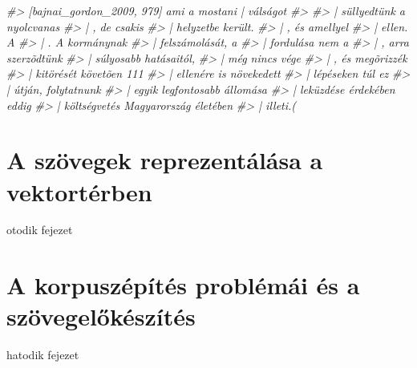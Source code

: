 \documentclass[
]{book}
\newenvironment{Shaded}{\begin{snugshade}}{\end{snugshade}}
\newcommand{\CommentTok}[1]{\textcolor[rgb]{0.56,0.35,0.01}{\textit{#1}}}
\begin{document}
\begin{Shaded}
\begin{Highlighting}[]
\CommentTok{\#\textgreater{}   [bajnai\_gordon\_2009, 979]                      ami a mostani |    válságot   }
\CommentTok{\#\textgreater{}                                      }
\CommentTok{\#\textgreater{}  | süllyedtünk a nyolcvanas          }
\CommentTok{\#\textgreater{}  | , de csakis                       }
\CommentTok{\#\textgreater{}  | helyzetbe került.                 }
\CommentTok{\#\textgreater{}  | , és amellyel                     }
\CommentTok{\#\textgreater{}  | ellen. A                          }
\CommentTok{\#\textgreater{}  | . A kormánynak                    }
\CommentTok{\#\textgreater{}  | felszámolását, a                  }
\CommentTok{\#\textgreater{}  | fordulása nem a                   }
\CommentTok{\#\textgreater{}  | , arra szerzõdtünk                }
\CommentTok{\#\textgreater{}  | súlyosabb hatásaitól,             }
\CommentTok{\#\textgreater{}  | még nincs vége                    }
\CommentTok{\#\textgreater{}  | , és megõrizzék                   }
\CommentTok{\#\textgreater{}  | kitörését követõen 111            }
\CommentTok{\#\textgreater{}  | ellenére is növekedett            }
\CommentTok{\#\textgreater{}  | lépéseken túl ez                  }
\CommentTok{\#\textgreater{}  | útján, folytatnunk                }
\CommentTok{\#\textgreater{}  | egyik legfontosabb állomása       }
\CommentTok{\#\textgreater{}  | leküzdése érdekében eddig         }
\CommentTok{\#\textgreater{}  | költségvetés Magyarország életében}
\CommentTok{\#\textgreater{}  | illeti.(}
\end{Highlighting}
\end{Shaded}

\hypertarget{a-szuxf6vegek-reprezentuxe1luxe1sa-a-vektortuxe9rben}{%
\chapter{A szövegek reprezentálása a
vektortérben}\label{a-szuxf6vegek-reprezentuxe1luxe1sa-a-vektortuxe9rben}}

otodik fejezet

\hypertarget{a-korpuszuxe9puxedtuxe9s-probluxe9muxe1i-uxe9s-a-szuxf6vegelux151kuxe9szuxedtuxe9s}{%
\chapter{A korpuszépítés problémái és a
szövegelőkészítés}\label{a-korpuszuxe9puxedtuxe9s-probluxe9muxe1i-uxe9s-a-szuxf6vegelux151kuxe9szuxedtuxe9s}}

hatodik fejezet
\end{document}
